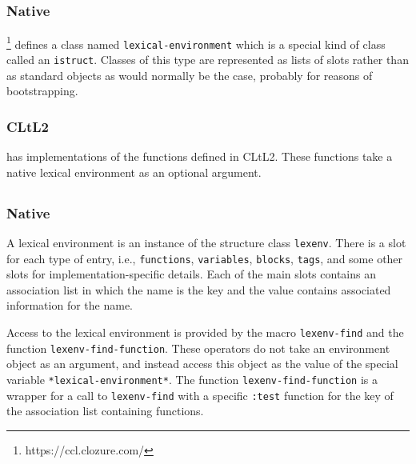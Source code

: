 \subsection{\ccl{}}

\subsubsection{Native}

\ccl{}%
\footnote{https://ccl.clozure.com/}
defines a class named \texttt{lexical-environment} which is a
special kind of class called an \texttt{istruct}.  Classes of this
type are represented as lists of slots rather than as standard objects
as would normally be the case, probably for reasons of bootstrapping.

\subsubsection{CLtL2}

\ccl{} has implementations of the functions defined in CLtL2.  These
functions take a native lexical environment as an optional argument.

\subsection{\cmucl{}}

\subsubsection{Native}

A lexical environment is an instance of the structure class
\texttt{lexenv}.  There is a slot for each type of entry, i.e.,
\texttt{functions}, \texttt{variables}, \texttt{blocks},
\texttt{tags}, and some other slots for implementation-specific
details.  Each of the main slots contains an association list in which
the name is the key and the value contains associated information for
the name.

Access to the lexical environment is provided by the macro
\texttt{lexenv-find} and the function \texttt{lexenv-find-function}.
These operators do not take an environment object as an argument, and
instead access this object as the value of the special variable
\texttt{*lexical-environment*}.  The function
\texttt{lexenv-find-function} is a wrapper for a call to
\texttt{lexenv-find} with a specific \texttt{:test} function for the
key of the association list containing functions.

